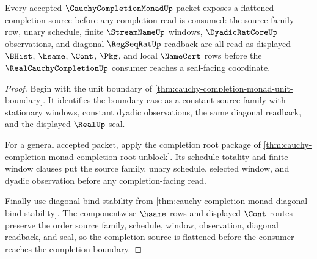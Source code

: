 \begin{theorem}
\label{thm:cauchycompletionmonad-flattened-completion-source}
Every accepted $\CauchyCompletionMonadUp$ packet exposes a flattened completion source before any completion read is consumed: the source-family row, unary schedule, finite $\StreamNameUp$ windows, $\DyadicRatCoreUp$ observations, and diagonal $\RegSeqRatUp$ readback are all read as displayed $\BHist$, $\hsame$, $\Cont$, $\Pkg$, and local $\NameCert$ rows before the $\RealCauchyCompletionUp$ consumer reaches a seal-facing coordinate.
\end{theorem}
\begin{proof}
Begin with the unit boundary of \autoref{thm:cauchy-completion-monad-unit-boundary}. It identifies the boundary case as a constant source family with stationary windows, constant dyadic observations, the same diagonal readback, and the displayed $\RealUp$ seal.

For a general accepted packet, apply the completion root package of \autoref{thm:cauchy-completion-monad-completion-root-unblock}. Its schedule-totality and finite-window clauses put the source family, unary schedule, selected window, and dyadic observation before any completion-facing read.

Finally use diagonal-bind stability from \autoref{thm:cauchy-completion-monad-diagonal-bind-stability}. The componentwise $\hsame$ rows and displayed $\Cont$ routes preserve the order source family, schedule, window, observation, diagonal readback, and seal, so the completion source is flattened before the consumer reaches the completion boundary.
\end{proof}

